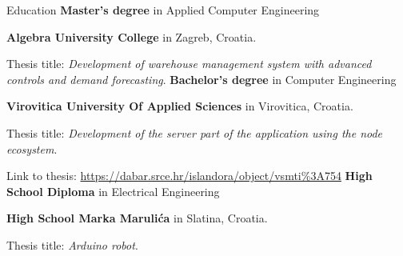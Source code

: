 \begin{rubric}{Education}
	\textbf{Master's degree} in Applied Computer Engineering \par \textbf{Algebra University College} in Zagreb, Croatia.
	\par Thesis title: \emph{Development of warehouse management system with advanced controls and demand forecasting}.
	\textbf{Bachelor's degree} in Computer Engineering \par \textbf{Virovitica University Of Applied Sciences} in Virovitica, Croatia.\par
	Thesis title: \emph{Development of the server part of the application using the node ecosystem}.
	\par Link to thesis: \url{https://dabar.srce.hr/islandora/object/vsmti%3A754}
	\textbf{High School Diploma} in Electrical Engineering \par \textbf{High School Marka Marulića} in Slatina, Croatia.\par
	Thesis title: \emph{Arduino robot}.
\end{rubric}